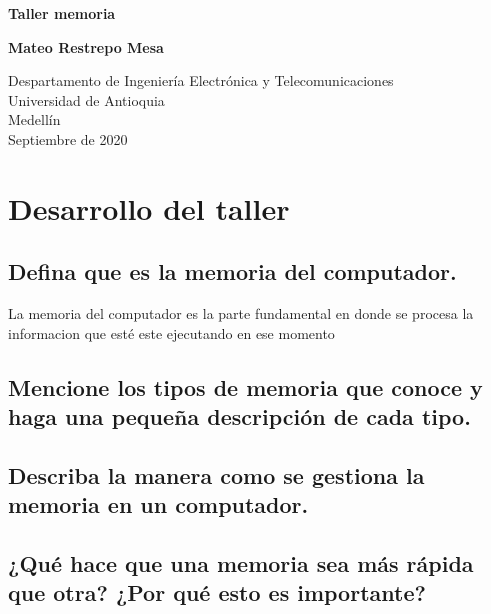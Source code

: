\documentclass{article}
\begin{document}
\begin{titlepage}
    \begin{center}
        \vspace*{1cm}
            
        \Huge
        \textbf{Taller memoria}
            
        \vspace{0.5cm}
        \LARGE
        
            
        \vspace{1.5cm}
            
        \textbf{ Mateo Restrepo Mesa }
            
        \vfill
            
        \vspace{0.8cm}
            
        \Large
        Despartamento de Ingeniería Electrónica y Telecomunicaciones\\
        Universidad de Antioquia\\
        Medellín\\
        Septiembre de 2020
            
    \end{center}
\end{titlepage}



\section{Desarrollo del taller} \label{contenido}

\subsection{Defina que es la memoria del computador.}
La memoria del computador es la parte fundamental en donde se procesa la informacion que esté este ejecutando en ese momento
\subsection{Mencione los tipos de memoria que conoce y haga una pequeña descripción de cada tipo.}
\subsection{Describa la manera como se gestiona la memoria en un computador.}
\subsection{¿Qué hace que una memoria sea más rápida que otra? ¿Por qué esto es importante?}
\end{document}
